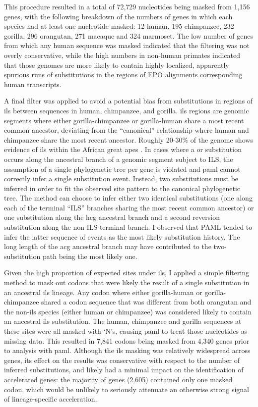 This procedure resulted in a total of 72,729 nucleotides being masked
from 1,156 genes, with the following breakdown of the numbers of genes
in which each species had at least one nucleotide masked: 12 human,
195 chimpanzee, 232 gorilla, 296 orangutan, 271 macaque and 324
marmoset.  The low number of genes from which any human sequence was
masked indicated that the filtering was not overly conservative, while
the high numbers in non-human primates indicated that those genomes
are more likely to contain highly localized, apparently spurious runs
of \nsyn substitutions in the regions of EPO alignments corresponding
human transcripts.

A final filter was applied to avoid a potential bias from
substitutions in regions of \ac{ils} between sequences in human,
chimpanzee, and gorilla. \ac{ils} regions are genomic segments where
either gorilla-chimpanzee or gorilla-human share a most recent common
ancestor, deviating from the ``canonical'' relationship where human
and chimpanzee share the most recent ancestor. Roughly 20-30\% of the
genome shows evidence of \ac{ils} within the African great apes
\citep{Hobolth2007}. In cases where a \syn or \nsyn substitution
occurs along the ancestral branch of a genomic segment subject to ILS,
the assumption of a single phylogenetic tree per gene is violated and
\ac{paml} cannot correctly infer a single substitution event. Instead,
two substitutions must be inferred in order to fit the observed site
pattern to the canonical phylogenetic tree. The method can choose to
infer either two identical substitutions (one along each of the
terminal ``ILS'' branches sharing the most recent common ancestor) or
one substitution along the \ac{hcg} ancestral branch and a second
reversion substitution along the non-ILS terminal branch. I observed
that PAML tended to infer the latter sequence of events as the most
likely substitution history. The long length of the \ac{acg} ancestral
branch may have contributed to the two-substitution path being the
most likely one.

Given the high proportion of expected sites under \ac{ils}, I applied
a simple filtering method to mask out codons that were likely the
result of a single substitution in an ancestral \ac{ils} lineage. Any
codon where either gorilla-human or gorilla-chimpanzee shared a codon
sequence that was different from both orangutan and the non-\ac{ils}
species (either human or chimpanzee) was considered likely to contain
an ancestral \ac{ils} substitution. The human, chimpanzee and gorilla
sequences at these sites were all masked with `N's, causing \ac{paml}
to treat those nucleotides as missing data. This resulted in 7,841
codons being masked from 4,340 genes prior to analysis with
\ac{paml}. Although the \ac{ils} masking was relatively widespread
across genes, its effect on the results was conservative with respect
to the number of inferred substitutions, and likely had a minimal
impact on the identification of accelerated genes: the majority of
genes (2,605) contained only one masked codon, which would be unlikely
to seriously attenuate an otherwise strong signal of lineage-specific
acceleration.

